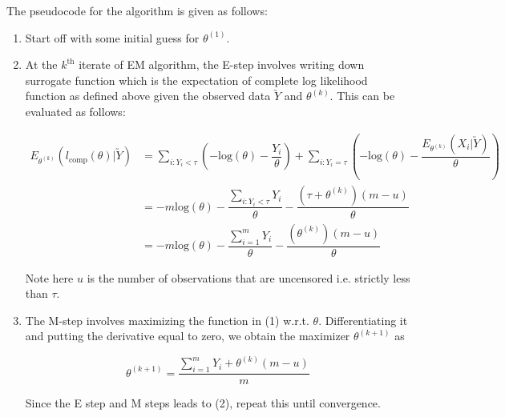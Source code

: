\documentclass[12pt]{article}
\begin{document}
The pseudocode for the algorithm is given as follows:
\begin{enumerate}[label=(\alph*)]
\item Start off with some initial guess for $\theta^{(1)}$.
\item At the $k^{\text{th}}$ iterate of EM algorithm, the E-step involves writing down surrogate function which is the expectation of complete log likelihood function as defined above given the observed data $\utilde{Y}$ and $\theta^{(k)}$. This can be evaluated as follows:

\begin{equation}
\begin{aligned}
E_{\theta^{(k)}}(l_{\text{comp}}(\theta)|\utilde{Y})&=\sum\limits_{i: Y_i<\tau}\left(-\text{log}(\theta)-\dfrac{Y_i}{\theta}\right)+\sum\limits_{i: Y_i=\tau}\left(-\text{log}(\theta)-\dfrac{E_{\theta^{(k)}}(X_i|\utilde{Y})}{\theta}\right)\\&=-m\text{log}(\theta)-\dfrac{\sum\limits_{i: Y_i<\tau}Y_i}{\theta}-\dfrac{(\tau+\theta^{(k)})(m-u)}{\theta}\\&=-m\text{log}(\theta)-\dfrac{\sum\limits_{i=1}^mY_i}{\theta}-\dfrac{(\theta^{(k)})(m-u)}{\theta}
\end{aligned}
\end{equation}

Note here $u$ is the number of observations that are uncensored i.e. strictly less than $\tau$. 
\item The M-step involves maximizing the function in (1) w.r.t. $\theta$. Differentiating it and putting the derivative equal to zero, we obtain the maximizer $\theta^{(k+1)}$ as 

\begin{equation}
\theta^{(k+1)}=\dfrac{\sum\limits_{i=1}^mY_i+\theta^{(k)}(m-u)}{m}
\end{equation}

Since the E step and M steps leads to (2), repeat this until convergence.
\end{enumerate}

\end{document}
